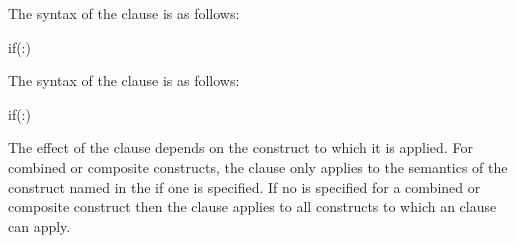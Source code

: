 \syntax
\begin{ccppspecific}

The syntax of the  clause is as follows:

\begin{ompSyntax}
if(\plc{[ directive-name-modifier }:\plc{] scalar-expression})
\end{ompSyntax}
\end{ccppspecific}

\begin{fortranspecific}

The syntax of the  clause is as follows:

\begin{ompSyntax}
if(\plc{[ directive-name-modifier }:\plc{] scalar-logical-expression})
\end{ompSyntax}
\end{fortranspecific}

\descr
The effect of the  clause depends on the construct to
which it is applied. For combined or composite constructs, the
 clause only applies to the semantics of the construct
named in the  if one is specified.
If no   is specified for a combined
or composite construct then the  clause applies to all
constructs to which an  clause can apply.





